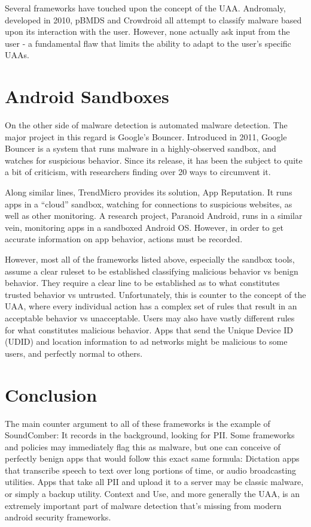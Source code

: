 Several frameworks have touched upon the concept of the UAA. Andromaly\citep{shabtai2012andromaly}, developed in 2010, pBMDS\citep{xie2010pbmds} and Crowdroid\citep{burguera2011crowdroid} all attempt to classify malware based upon its interaction with the user. However, none actually ask input from the user - a fundamental flaw that limits the ability to adapt to the user's specific UAAs.

\section{Android Sandboxes}
On the other side of malware detection is automated malware detection. The major project in this regard is Google's Bouncer\citep{googlebouncer}. Introduced in 2011, Google Bouncer is a system that runs malware in a highly-observed sandbox, and watches for suspicious behavior. Since its release, it has been the subject to quite a bit of criticism\citep{mansfield2012android}, with researchers finding over 20 ways to circumvent it.

Along similar lines, TrendMicro provides its solution, App Reputation\citep{trendmicroappreputation}. It runs apps in a ``cloud'' sandbox, watching for connections to suspicious websites, as well as other monitoring. A research project, Paranoid Android\citep{portokalidis2010paranoid}, runs in a similar vein, monitoring apps in a sandboxed Android OS. However, in order to get accurate information on app behavior, actions must be recorded.

However, most all of the frameworks listed above, especially the sandbox tools, assume a clear ruleset to be established classifying malicious behavior vs benign behavior. They require a clear line to be established as to what constitutes trusted behavior vs untrusted. Unfortunately, this is counter to the concept of the UAA, where every individual action has a complex set of rules that result in an acceptable behavior vs unacceptable. Users may also have vastly different rules for what constitutes malicious behavior. Apps that send the Unique Device ID (UDID) and location information to ad networks might be malicious to some users, and perfectly normal to others.


\section{Conclusion}
The main counter argument to all of these frameworks is the example of SoundComber: It records in the background, looking for PII. Some frameworks and policies may immediately flag this as malware, but one can conceive of perfectly benign apps that would follow this exact same formula: Dictation apps that transcribe speech to text over long portions of time, or audio broadcasting utilities. Apps that take all PII and upload it to a server may be classic malware, or simply a backup utility. Context and Use, and more generally the UAA, is an extremely important part of malware detection that's missing from modern android security frameworks.
